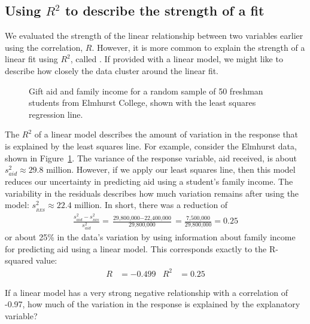 

\subsection{Using $R^2$ to describe the strength of a fit}


We evaluated the strength of the linear relationship between
two variables earlier using the correlation, $R$.
However, it is more common to explain the strength of a linear
fit using $R^2$, called
.
If provided with a linear model, we might like to describe how
closely the data cluster around the linear fit.

\begin{figure}[h]
  \centering
  \caption{Gift aid and family income for a random sample
      of 50 freshman students from Elmhurst College, shown
      with the least squares regression line.}
  \label{elmhurstScatterWLSROnly}
\end{figure}

\newcommand{\mil}[0]{\text{ million}}
The $R^2$ of a linear model describes the amount of variation
in the response that is explained by the least squares line.
For example, consider the Elmhurst data,
shown in Figure~\ref{elmhurstScatterWLSROnly}.
The variance of the response variable, aid received,
is about $s_{aid}^2 \approx 29.8$ million.
However, if we apply our least squares line, then this model
reduces our uncertainty in predicting aid using a student's
family income.
The variability in the residuals describes how much variation
remains after using the model: $s_{_{RES}}^2 \approx 22.4$ million.
In short, there was a reduction of
\begin{align*}
\frac{s_{aid}^2 - s_{_{RES}}^2}{s_{aid}^2}
  = \frac{\text{29,800,000} - \text{22,400,000}}
      {\text{29,800,000}}
  = \frac{\text{7,500,000}}{\text{29,800,000}}
  = 0.25
\end{align*}
or about  25\% in the data's variation by using information
about family income for predicting aid using a linear model.
This corresponds exactly to the R-squared value:
\begin{align*}
R &= -0.499 &R^2 &= 0.25
\end{align*}

\begin{exercisewrap}
\begin{nexercise}
If a linear model has a very strong negative relationship with
a correlation of -0.97, how much of the variation in the response
is explained by the explanatory variable?\footnotemark{}
\end{nexercise}
\end{exercisewrap}

